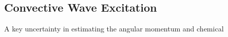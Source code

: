 {\color{purple}
\subsection{Convective Wave Excitation}
}

A key uncertainty in estimating the angular momentum and chemical 
